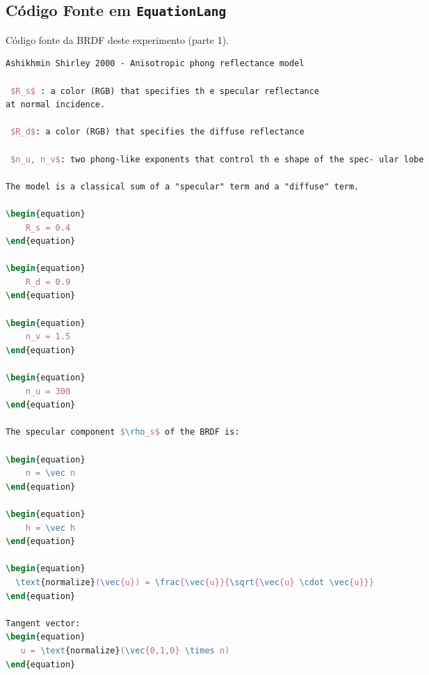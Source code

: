 \subsection{Código Fonte em \texttt{EquationLang}}
\begin{codigo}[H]
    \caption{\small Código fonte da BRDF deste experimento (parte 1).}
    \label{cod-ashikhmin-shirley-close-to-original-eqlang}
\begin{lstlisting}[language=tex, frame=none, inputencoding=utf8]
Ashikhmin Shirley 2000 - Anisotropic phong reflectance model

 $R_s$ : a color (RGB) that specifies th e specular reflectance
at normal incidence.

 $R_d$: a color (RGB) that specifies the diffuse reflectance

 $n_u, n_v$: two phong-like exponents that control th e shape of the spec- ular lobe

The model is a classical sum of a "specular" term and a "diffuse" term.

\begin{equation}
    R_s = 0.4
\end{equation}

\begin{equation}
    R_d = 0.9
\end{equation}

\begin{equation}
    n_v = 1.5
\end{equation}

\begin{equation}
    n_u = 300
\end{equation}

The specular component $\rho_s$ of the BRDF is:

\begin{equation}
    n = \vec n
\end{equation}

\begin{equation}
    h = \vec h
\end{equation}

\begin{equation}
  \text{normalize}(\vec{u}) = \frac{\vec{u}}{\sqrt{\vec{u} \cdot \vec{u}}}
\end{equation}

Tangent vector:
\begin{equation}
   u = \text{normalize}(\vec{0,1,0} \times n)
\end{equation}



\end{lstlisting}
\end{codigo}
